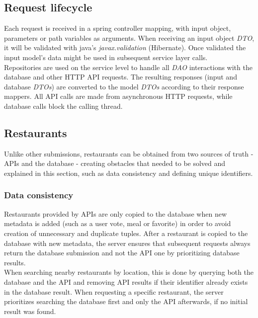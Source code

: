 \subsection{Request lifecycle}
Each request is received in a spring controller mapping, with input object,
parameters or path variables as arguments. When receiving an input object \textit{DTO},
it will be validated with java's \textit{javax.validation} (Hibernate).
Once validated the input model's data might be used in subsequent service layer calls.\\

Repositories are used on the service level to handle all \textit{DAO} interactions with
the database and other HTTP API requests. The resulting responses (input and database \textit{DTOs})
are converted to the model \textit{DTOs} according to their response mappers.
All API calls are made from asynchronous HTTP requests, while database calls block the calling thread.\\

\subsection{Restaurants}

Unlike other submissions, restaurants can be obtained from two sources of truth - APIs and the database -
creating obstacles that needed to be solved and explained in this section, such as data consistency and defining unique identifiers.\\

\subsubsection{Data consistency}

Restaurants provided by APIs are only copied to the database when new metadata is added (such as a user vote, meal or favorite) in order
to avoid creation of unnecessary and duplicate tuples. After a restaurant is copied to the database with new metadata, the server ensures
that subsequent requests always return the database submission and not the API one by prioritizing database results.\\

When searching nearby restaurants by location, this is done by querying both the database and the API and removing API results if their
identifier already exists in the database result. When requesting a specific restaurant, the server prioritizes searching the database
first and only the API afterwards, if no initial result was found.\\

